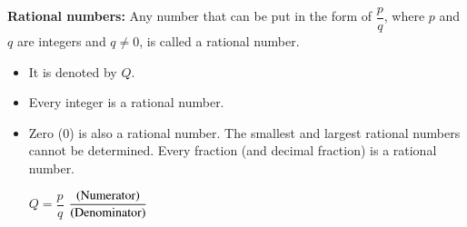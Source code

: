 \begin{multicols}{2}
\textbf{Rational numbers:} Any number that can be put in the form of $\dfrac{p}{q}$, where $p$ and $q$ are integers and $q \neq 0$, is called a rational number.
\begin{itemize}
\item It is denoted by $Q$.
\item Every integer is a rational number.
\item Zero (0) is also a rational number. The smallest and largest rational numbers cannot be determined. Every fraction (and decimal fraction) is a rational number.

  $Q = \dfrac{p}{q}$ $\dfrac{(\rm Numerator)}{(\rm Denominator)}$
  \end{itemize}




\end{multicols}

